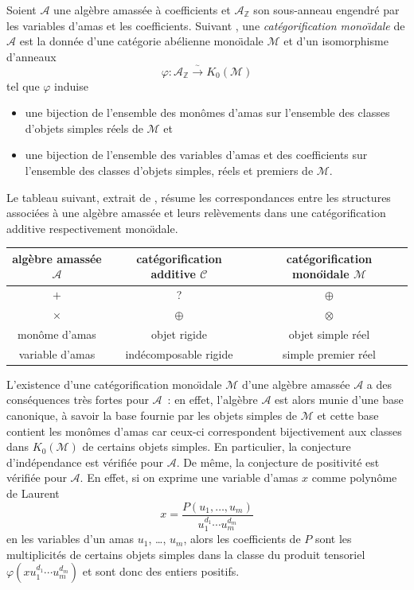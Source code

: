 \documentclass[brochure,12pt]{bourbaki}
\newcommand{\og}{\guillemotleft\hspace*{1pt}}
\newcommand{\fg}{\hspace*{1pt}\guillemotright}
\numberwithin{equation}{subsection}
\numberwithin{theorem}{section}
\newcommand{\Z}{\mathbb{Z}}
\newcommand{\iso}{\stackrel{_\sim}{\rightarrow}}
\newcommand{\ca}{{\mathcal A}}
\newcommand{\cc}{{\mathcal C}}
\newcommand{\cm}{{\mathcal M}}
\renewcommand{\phi}{\varphi}
\begin{document}
Soient $\ca$ une alg\`ebre amass\'ee \`a coefficients et $\ca_\Z$ son
sous-anneau engendr\'e par les variables d'amas et les coefficients.
Suivant \cite{HernandezLeclerc09},
une {\em cat\'egorification mono\"{\i}dale} de $\ca$ est la donn\'ee
d'une cat\'egorie ab\'elienne mono\"{\i}dale $\cm$ et d'un isomorphisme d'anneaux
\[
\phi: \ca_\Z \iso K_0(\cm)
\]
tel que $\phi$ induise
\begin{itemize}
\item[a)] une bijection de l'ensemble des mon\^omes d'amas sur l'ensemble
des classes d'objets simples r\'eels de $\cm$ et
\item[b)] une bijection de l'ensemble des variables d'amas et des coefficients
sur l'ensemble des classes d'objets simples, r\'eels et premiers de $\cm$.
\end{itemize}
Le tableau suivant, extrait de \cite{Leclerc08a}, r\'esume les correspondances
entre les structures associ\'ees \`a une alg\`ebre amass\'ee et
leurs rel\`evements dans une cat\'egorification additive respectivement mono\"{\i}dale.
\begin{center}
\begin{tabular}{|c|c|c|} \hline
alg\`ebre amass\'ee $\ca$ & cat\'egorification additive $\cc$
                             & cat\'egorification mono\"{\i}dale $\cm$ \\ \hline
$+$ & ? & $\oplus$ \\
$\times$ & $\oplus$ & $\otimes$ \\
mon\^ome d'amas & objet rigide & objet simple r\'eel \\
variable d'amas & ind\'ecomposable rigide & simple premier r\'eel \\ \hline
\end{tabular}
\bigskip
\end{center}
L'existence d'une cat\'egorification mono\"{\i}dale $\cm$ d'une alg\`ebre
amass\'ee $\ca$ a des cons\'equences tr\`es fortes pour $\ca$~: en effet,
l'alg\`ebre $\ca$ est alors munie d'une \og base canonique\fg, \`a savoir la base fournie par
les objets simples de $\cm$ et cette base contient les mon\^omes d'amas
car ceux-ci correspondent bijectivement aux classes dans $K_0(\cm)$ de certains
objets simples. En particulier,
la conjecture d'ind\'ependance est v\'erifi\'ee pour $\ca$.
De m\^eme, la conjecture de positivit\'e est v\'erifi\'ee pour $\ca$. En effet,
si on exprime une variable d'amas $x$ comme polyn\^ome de Laurent
\[
x=\frac{P(u_1, \ldots, u_m)}{u_1^{d_1} \cdots u_m^{d_m}}
\]
en les variables d'un amas $u_1$, \ldots, $u_m$, alors les coefficients
de $P$ sont les multiplicit\'es de certains objets simples dans
la classe du produit tensoriel $\phi(x u_1^{d_1} \cdots u_m^{d_m})$ et sont
donc des entiers positifs.
\end{document}
